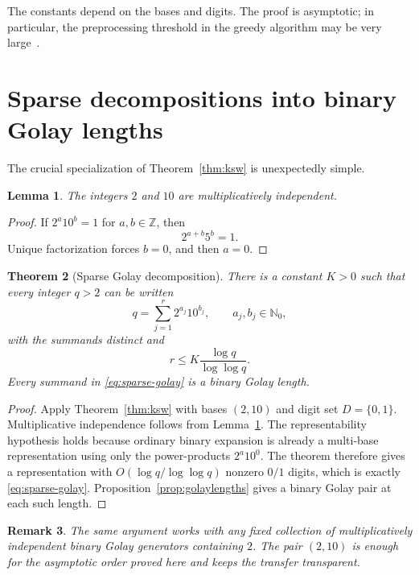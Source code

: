 \documentclass[11pt]{article}
\newtheorem{theorem}{Theorem}[section]
\newtheorem{lemma}[theorem]{Lemma}
\newtheorem{remark}[theorem]{Remark}
\newcommand{\N}{\mathbb{N}}
\begin{document}
The constants depend on the bases and digits.  The proof is asymptotic; in particular, the preprocessing threshold in the greedy algorithm may be very large~\cite{Krenn2020}.

\section{Sparse decompositions into binary Golay lengths}
The crucial specialization of Theorem~\ref{thm:ksw} is unexpectedly simple.

\begin{lemma}\label{lem:independence}
The integers $2$ and $10$ are multiplicatively independent.
\end{lemma}
\begin{proof}
If $2^a10^b=1$ for $a,b\in\mathbb Z$, then
\[
2^{a+b}5^b=1.
\]
Unique factorization forces $b=0$, and then $a=0$.
\end{proof}

\begin{theorem}[Sparse Golay decomposition]\label{thm:sparse-golay}
There is a constant $K>0$ such that every integer $q>2$ can be written
\begin{equation}\label{eq:sparse-golay}
q=\sum_{j=1}^{r}2^{a_j}10^{b_j},
\qquad a_j,b_j\in\N_0,
\end{equation}
with the summands distinct and
\[
r\le K\frac{\log q}{\log\log q}.
\]
Every summand in \eqref{eq:sparse-golay} is a binary Golay length.
\end{theorem}

\begin{proof}
Apply Theorem~\ref{thm:ksw} with bases $(2,10)$ and digit set $D=\{0,1\}$.  Multiplicative independence follows from Lemma~\ref{lem:independence}.  The representability hypothesis holds because ordinary binary expansion is already a multi-base representation using only the power-products $2^a10^0$.  The theorem therefore gives a representation with $O(\log q/\log\log q)$ nonzero $0/1$ digits, which is exactly \eqref{eq:sparse-golay}.  Proposition~\ref{prop:golaylengths} gives a binary Golay pair at each such length.
\end{proof}

\begin{remark}\label{rem:morebases}
The same argument works with any fixed collection of multiplicatively independent binary Golay generators containing $2$.  The pair $(2,10)$ is enough for the asymptotic order proved here and keeps the transfer transparent.
\end{remark}
\end{document}

